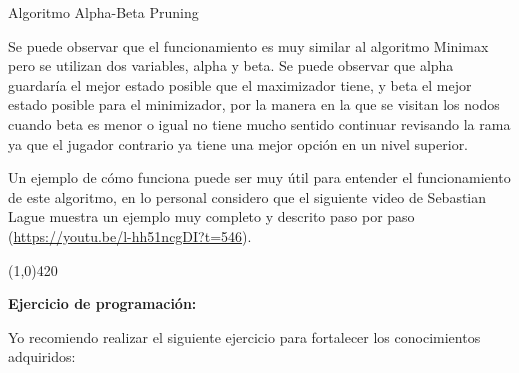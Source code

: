 \documentclass[11pt,fleqn]{book} %
\begin{document}
\begin{algorithm}
  \DontPrintSemicolon
  
  \;

  \caption{Algoritmo Alpha-Beta Pruning}
\end{algorithm}


Se puede observar que el funcionamiento es muy similar al algoritmo Minimax pero se utilizan dos variables, alpha y beta. Se puede observar que alpha guardaría el mejor estado posible que el maximizador tiene, y beta el mejor estado posible para el minimizador, por la manera en la que se visitan los nodos cuando beta es menor o igual no tiene mucho sentido continuar revisando la rama ya que el jugador contrario ya tiene una mejor opción en un nivel superior.

Un ejemplo de cómo funciona puede ser muy útil para entender el funcionamiento de este algoritmo, en lo personal considero que el siguiente video de Sebastian Lague muestra un ejemplo muy completo y descrito paso por paso (\url{https://youtu.be/l-hh51ncgDI?t=546}).

\begin{center}
\line(1,0){420}
\end{center}

\textbf{Ejercicio de programación:}

Yo recomiendo realizar el siguiente ejercicio para fortalecer los conocimientos adquiridos:
\end{document}
